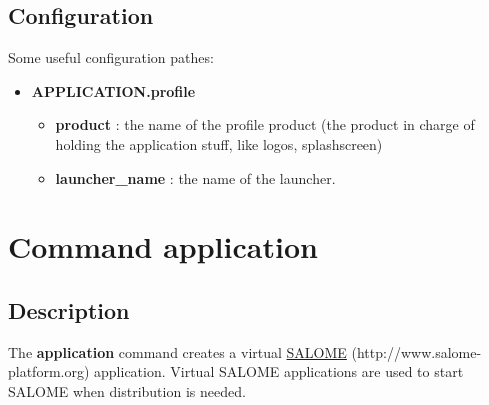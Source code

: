 \documentclass[a4paper,10pt,english]{sphinxmanual}
\begin{document}
\subsection{Configuration}
\label{commands/launcher:configuration}
Some useful configuration pathes:
\begin{itemize}
\item {} 
\textbf{APPLICATION.profile}
\begin{itemize}
\item {} 
\textbf{product} : the name of the profile product (the product in charge of holding the application stuff, like logos, splashscreen)

\item {} 
\textbf{launcher\_name} : the name of the launcher.

\end{itemize}

\end{itemize}
\clearpage

\section{Command application}
\label{commands/application:svn}\label{commands/application::doc}\label{commands/application:command-application}

\subsection{Description}
\label{commands/application:description}
The \textbf{application} command creates a virtual \href{http://www.salome-platform.org}{SALOME} (http://www.salome-platform.org) application.
Virtual SALOME applications are used to start SALOME when distribution is needed.
\end{document}
